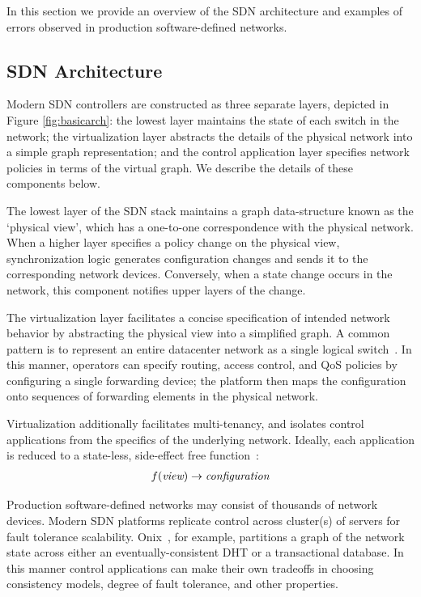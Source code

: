 In this section we provide an overview of the SDN architecture and examples 
of errors observed in production software-defined networks.

\subsection{SDN Architecture}

Modern SDN controllers are constructed as three separate layers, depicted in Figure \ref{fig:basicarch}:
the lowest layer maintains the state of each switch in the network; the virtualization layer 
abstracts the details of the physical network into a simple graph representation;
and the control application layer specifies network policies in terms of the
virtual graph. We describe the details of these components below.

The lowest layer of the SDN stack maintains a graph data-structure known as
the `physical view', which has a one-to-one correspondence with the physical
network. When a higher layer specifies a policy change on the physical view,
synchronization logic generates configuration changes and sends it to the
corresponding network devices. Conversely, when a state change
occurs in the network, this component notifies upper layers of the change.

The virtualization layer facilitates a concise specification of
intended network behavior by abstracting the physical view into a simplified
graph. A common pattern is to represent an entire
datacenter network as a single logical
switch~\cite{Casado:2010:VNF:1921151.1921162}. In this manner, operators
can specify routing, access control, and QoS policies by configuring a single forwarding
device; the platform then maps the configuration onto sequences 
of forwarding elements in the physical network.

Virtualization additionally facilitates multi-tenancy, and isolates control applications from the specifics
of the underlying network. Ideally,  each application is reduced to a
state-less, side-effect free function~\cite{keynote}:
\begin{align*}
f(\text{\it view}) \rightarrow \text{\it configuration}
\end{align*}

Production software-defined networks may consist of thousands of network
devices. Modern SDN platforms replicate control across cluster(s) of servers
for fault tolerance scalability.
Onix~\cite{onix}, for example,
partitions a graph of the network state across either an eventually-consistent
DHT or a transactional database. In this manner control applications can make their own
tradeoffs in choosing consistency models, degree of
fault tolerance, and other properties.


